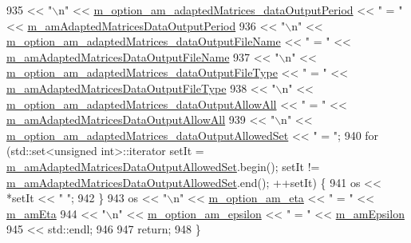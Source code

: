 \begin{DoxyCode}
935      << \textcolor{stringliteral}{"\(\backslash\)n"} << \hyperlink{class_q_u_e_s_o_1_1_m_l_sampling_level_options_ac8ab2064bc916c10fa3c7bf1793869e8}{m\_option\_am\_adaptedMatrices\_dataOutputPeriod}   
           << \textcolor{stringliteral}{" = "} << \hyperlink{class_q_u_e_s_o_1_1_m_l_sampling_level_options_a8c7ce073c75774afdbffa1ba3674085c}{m\_amAdaptedMatricesDataOutputPeriod}
936      << \textcolor{stringliteral}{"\(\backslash\)n"} << \hyperlink{class_q_u_e_s_o_1_1_m_l_sampling_level_options_a50b0b030e51402badf96072ea3add0ba}{m\_option\_am\_adaptedMatrices\_dataOutputFileName}
            << \textcolor{stringliteral}{" = "} << \hyperlink{class_q_u_e_s_o_1_1_m_l_sampling_level_options_a7dde9af112143992a87a72635e63a864}{m\_amAdaptedMatricesDataOutputFileName}
937      << \textcolor{stringliteral}{"\(\backslash\)n"} << \hyperlink{class_q_u_e_s_o_1_1_m_l_sampling_level_options_adaf47c65997276c4e7a2e5437a49f5eb}{m\_option\_am\_adaptedMatrices\_dataOutputFileType}
            << \textcolor{stringliteral}{" = "} << \hyperlink{class_q_u_e_s_o_1_1_m_l_sampling_level_options_ab209a7f5dac6c2b4e108a7a1829631c6}{m\_amAdaptedMatricesDataOutputFileType}
938      << \textcolor{stringliteral}{"\(\backslash\)n"} << \hyperlink{class_q_u_e_s_o_1_1_m_l_sampling_level_options_a455507e07fb1494b26f4b387a72ca7b3}{m\_option\_am\_adaptedMatrices\_dataOutputAllowAll}
            << \textcolor{stringliteral}{" = "} << \hyperlink{class_q_u_e_s_o_1_1_m_l_sampling_level_options_ad1ac51fd4b35c5decca04048ebeca3f2}{m\_amAdaptedMatricesDataOutputAllowAll}
939      << \textcolor{stringliteral}{"\(\backslash\)n"} << \hyperlink{class_q_u_e_s_o_1_1_m_l_sampling_level_options_a28e11986f1c955a367517086890f42bc}{m\_option\_am\_adaptedMatrices\_dataOutputAllowedSet}
          << \textcolor{stringliteral}{" = "};
940   \textcolor{keywordflow}{for} (std::set<unsigned int>::iterator setIt = 
      \hyperlink{class_q_u_e_s_o_1_1_m_l_sampling_level_options_a7bab0713dca38607204e38ce661799bb}{m\_amAdaptedMatricesDataOutputAllowedSet}.begin(); setIt != 
      \hyperlink{class_q_u_e_s_o_1_1_m_l_sampling_level_options_a7bab0713dca38607204e38ce661799bb}{m\_amAdaptedMatricesDataOutputAllowedSet}.end(); ++setIt) \{
941     os << *setIt << \textcolor{stringliteral}{" "};
942   \}
943   os << \textcolor{stringliteral}{"\(\backslash\)n"} << \hyperlink{class_q_u_e_s_o_1_1_m_l_sampling_level_options_a6fb0d64c285c2a3411fb24667a03f747}{m\_option\_am\_eta}                                     << \textcolor{stringliteral}{" = "} << 
      \hyperlink{class_q_u_e_s_o_1_1_m_l_sampling_level_options_a87fe9b1c390bf7bff2ecc329064e7618}{m\_amEta}
944      << \textcolor{stringliteral}{"\(\backslash\)n"} << \hyperlink{class_q_u_e_s_o_1_1_m_l_sampling_level_options_a5ecc043caa63c4a6980ed61f370bd59a}{m\_option\_am\_epsilon}                                 << \textcolor{stringliteral}{" = "} << 
      \hyperlink{class_q_u_e_s_o_1_1_m_l_sampling_level_options_abf07f60a5115657e18d39a586a8093ac}{m\_amEpsilon}
945      << std::endl;
946 
947   \textcolor{keywordflow}{return};
948 \}
\end{DoxyCode}
